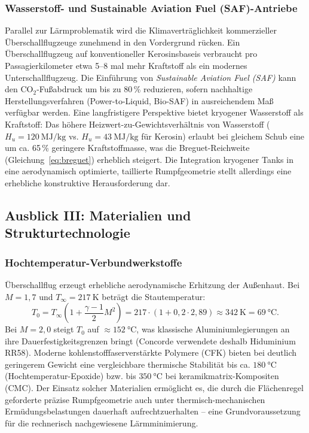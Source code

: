 ﻿\documentclass[12pt,a4paper]{article}
\theoremstyle{definition}
\theoremstyle{remark}
\begin{document}
\subsubsection{Wasserstoff- und Sustainable Aviation Fuel (SAF)-Antriebe}

Parallel zur Lärmproblematik wird die Klimaverträglichkeit kommerzieller Überschallflugzeuge
zunehmend in den Vordergrund rücken. Ein Überschallflugzeug auf konventioneller Kerosinsbaseis
verbraucht pro Passagierkilometer etwa 5--8 mal mehr Kraftstoff als ein modernes
Unterschallflugzeug. Die Einführung von \emph{Sustainable Aviation Fuel (SAF)} kann den
CO$_2$-Fußabdruck um bis zu 80\,\% reduzieren, sofern nachhaltige Herstellungsverfahren
(Power-to-Liquid, Bio-SAF) in ausreichendem Maß verfügbar werden. Eine langfristigere
Perspektive bietet kryogener Wasserstoff als Kraftstoff: Das höhere Heizwert-zu-Gewichtsverhältnis
von Wasserstoff ($H_u = \SI{120}{\mega\joule\per\kilogram}$ vs. $H_u = \SI{43}{\mega\joule\per\kilogram}$
für Kerosin) erlaubt bei gleichem Schub eine um ca. 65\,\% geringere Kraftstoffmasse, was
die Breguet-Reichweite (Gleichung~\eqref{eq:breguet}) erheblich steigert. Die Integration
kryogener Tanks in eine aerodynamisch optimierte, taillierte Rumpfgeometrie stellt
allerdings eine erhebliche konstruktive Herausforderung dar.

\subsection{Ausblick III: Materialien und Strukturtechnologie}
\label{sec:ausblick_material}

\subsubsection{Hochtemperatur-Verbundwerkstoffe}

Überschallflug erzeugt erhebliche aerodynamische Erhitzung der Außenhaut.
Bei $M = 1{,}7$ und $T_\infty = \SI{217}{\kelvin}$ beträgt die Stautemperatur:
\begin{equation}
  T_0 = T_\infty \left(1 + \frac{\gamma - 1}{2} M^2\right) = 217 \cdot (1 + 0{,}2 \cdot 2{,}89)
      \approx \SI{342}{\kelvin} = \SI{69}{\celsius}.
  \label{eq:stautemperatur}
\end{equation}
Bei $M = 2{,}0$ steigt $T_0$ auf $\approx \SI{152}{\celsius}$, was klassische Aluminiumlegierungen
an ihre Dauerfestigkeitsgrenzen bringt (Concorde verwendete deshalb Hiduminium RR58).
Moderne kohlenstofffaserverstärkte Polymere (CFK) bieten bei deutlich geringerem Gewicht
eine vergleichbare thermische Stabilität bis ca. $\SI{180}{\celsius}$ (Hochtemperatur-Epoxide)
bzw. bis $\SI{350}{\celsius}$ bei keramikmatrix-Kompositen (CMC). Der Einsatz solcher
Materialien ermöglicht es, die durch die Flächenregel geforderte präzise Rumpfgeometrie
auch unter thermisch-mechanischen Ermüdungsbelastungen dauerhaft aufrechtzuerhalten -- eine
Grundvoraussetzung für die rechnerisch nachgewiesene Lärmminimierung.
\end{document}
